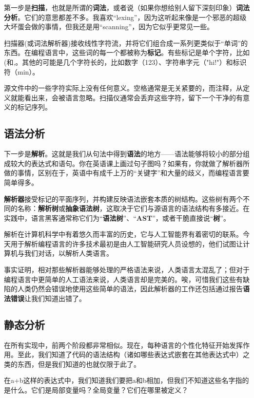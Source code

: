 \documentclass[cn,11pt,chinese]{elegantbook}
\begin{document}
第一步是\textbf{扫描}，也就是所谓的\textbf{词法}，或者说（如果你想给别人留下深刻印象）\textbf{词法分析}。它们的意思都差不多。我喜欢“lexing”，因为这听起来像是一个邪恶的超级大坏蛋会做的事情，但我还是用“scanning”，因为它似乎更常见一些。

扫描器(或词法解析器)接收线性字符流，并将它们组合成一系列更类似于“单词”的东西。在编程语言中，这些词的每一个都被称为\textbf{标记}。有些标记是单个字符，比如(和,。其他的可能是几个字符长的，比如数字（123）、字符串字元（"hi!"）和标识符（min）。

源文件中的一些字符实际上没有任何意义。空格通常是无关紧要的，而注释，从定义就能看出来，会被语言忽略。扫描仪通常会丢弃这些字符，留下一个干净的有意义的标记序列。

\subsection{语法分析}

下一步是\textbf{解析}。这就是我们从句法中得到\textbf{语法}的地方——语法能够将较小的部分组成较大的表达式和语句。你在英语课上画过句子图吗？如果有，你就做了解析器所做的事情，区别在于，英语中有成千上万的“关键字”和大量的歧义，而编程语言要简单得多。

\textbf{解析器}接受标记的平面序列，并构建反映语法嵌套本质的树结构。这些树有两个不同的名称：\textbf{解析树}或\textbf{抽象语法树}，这取决于它们与源语言的语法结构有多接近。在实践中，语言黑客通常称它们为“\textbf{语法树}”、“\textbf{AST}”，或者干脆直接说“\textbf{树}”。

解析在计算机科学中有着悠久而丰富的历史，它与人工智能界有着密切的联系。今天用于解析编程语言的许多技术最初是由人工智能研究人员设想的，他们试图让计算机与我们对话，以解析人类语言。

事实证明，相对那些解析器能够处理的严格语法来说，人类语言太混乱了；但对于编程语言中更简单的人工语法来说，人类语言却是完美的。唉，可惜我们这些有缺陷的人类仍然会错误地使用这些简单的语法，因此解析器的工作还包括通过报告\textbf{语法错误}让我们知道出错了。

\subsection{静态分析}

在所有实现中，前两个阶段都非常相似。现在，每种语言的个性化特征开始发挥作用。至此，我们知道了代码的语法结构（诸如哪些表达式嵌套在其他表达式中）之类的东西，但是我们知道的也就仅限于此了。

在a+b这样的表达式中，我们知道我们要把a和b相加，但我们不知道这些名字指的是什么。它们是局部变量吗？全局变量？它们在哪里被定义？
\end{document}
